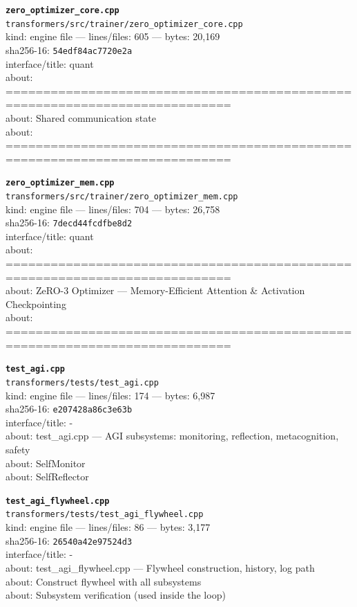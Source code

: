 \noindent\textbf{\texttt{zero\_optimizer\_core.cpp}}\\
\texttt{transformers/src/trainer/zero\_optimizer\_core.cpp}\\
kind: engine file --- lines/files: 605 --- bytes: 20,169\\
sha256-16: \texttt{54edf84ac7720e2a}\\
interface/title: quant\\
about: ============================================================================\\
about: Shared communication state\\
about: ============================================================================\\
\vspace*{6.0pt}

\noindent\textbf{\texttt{zero\_optimizer\_mem.cpp}}\\
\texttt{transformers/src/trainer/zero\_optimizer\_mem.cpp}\\
kind: engine file --- lines/files: 704 --- bytes: 26,758\\
sha256-16: \texttt{7decd44fcdfbe8d2}\\
interface/title: quant\\
about: ============================================================================\\
about: ZeRO-3 Optimizer — Memory-Efficient Attention \& Activation Checkpointing\\
about: ============================================================================\\
\vspace*{6.0pt}

\noindent\textbf{\texttt{test\_agi.cpp}}\\
\texttt{transformers/tests/test\_agi.cpp}\\
kind: engine file --- lines/files: 174 --- bytes: 6,987\\
sha256-16: \texttt{e207428a86c3e63b}\\
interface/title: -\\
about: test\_agi.cpp — AGI subsystems: monitoring, reflection, metacognition, safety\\
about: SelfMonitor\\
about: SelfReflector\\
\vspace*{6.0pt}

\noindent\textbf{\texttt{test\_agi\_flywheel.cpp}}\\
\texttt{transformers/tests/test\_agi\_flywheel.cpp}\\
kind: engine file --- lines/files: 86 --- bytes: 3,177\\
sha256-16: \texttt{26540a42e97524d3}\\
interface/title: -\\
about: test\_agi\_flywheel.cpp — Flywheel construction, history, log path\\
about: Construct flywheel with all subsystems\\
about: Subsystem verification (used inside the loop)\\
\vspace*{6.0pt}
\newpage

